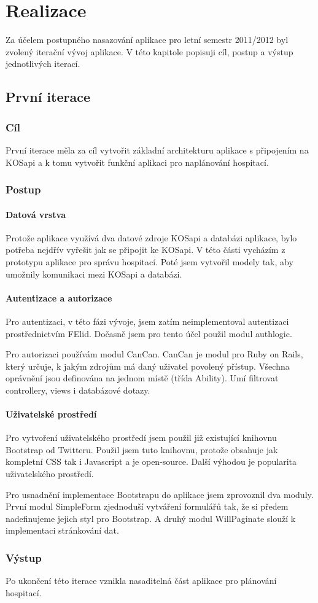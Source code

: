 \chapter{Realizace}
Za účelem postupného nasazování aplikace pro letní semestr 2011/2012 byl zvolený iterační vývoj aplikace. V této kapitole popisuji cíl, postup a výstup jednotlivých iterací.

\section{První iterace}
\subsection{Cíl}
První iterace měla za cíl vytvořit základní architekturu aplikace s připojením na KOSapi a k tomu vytvořit funkční aplikaci pro naplánování hospitací.

\subsection{Postup}
\subsubsection{Datová vrstva}
Protože aplikace využívá dva datové zdroje KOSapi a databázi aplikace, bylo potřeba nejdřív vyřešit jak se připojit ke KOSapi. V této části vycházím z prototypu aplikace pro správu hospitací. Poté jsem vytvořil modely tak, aby umožnily komunikaci mezi KOSapi a databázi.

\subsubsection{Autentizace a autorizace}
Pro autentizaci, v této fázi vývoje, jsem zatím neimplementoval autentizaci prostřednictvím FElid. Dočasně jsem pro tento účel použil modul authlogic.

Pro autorizaci používám modul CanCan. CanCan je modul pro Ruby on Rails, který určuje, k jakým zdrojům má daný uživatel povolený přístup. Všechna oprávnění jsou definována na jednom místě (třída Ability). Umí filtrovat controllery, views i databázové dotazy.

\subsubsection{Uživatelské prostředí}
Pro vytvoření uživatelského prostředí jsem použil již existující knihovnu Bootstrap od Twitteru. Použil jsem tuto knihovnu, protože obsahuje jak kompletní CSS tak i Javascript a je open-source. Další výhodou je popularita uživatelského prostředí.

Pro usnadnění implementace Bootstrapu do aplikace jsem zprovoznil dva moduly. První modul SimpleForm zjednoduší vytváření formulářů tak, že si předem nadefinujeme jejich styl pro Bootstrap. A druhý modul WillPaginate slouží k implementaci stránkování dat.

\subsection{Výstup} 
Po ukončení této iterace vznikla nasaditelná část aplikace pro plánování hospitací.
